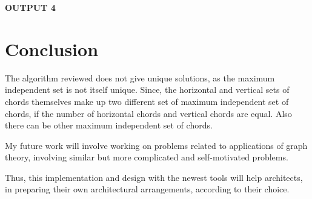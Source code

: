 \textbf{OUTPUT 4} 

\begin{figure}[h]
  \flushleft
\end{figure}

\chapter{Conclusion}
\label{Conclusion}

The algorithm reviewed does not give unique solutions, as the maximum independent set is not itself unique. Since, the horizontal and vertical sets of chords themselves make up two different set of maximum independent set of chords, if the number of horizontal chords and vertical chords are equal. Also there can be other maximum independent set of chords.

My future work will involve working on problems related to applications of graph theory, involving similar but more complicated and self-motivated problems.

Thus, this implementation and design with the newest tools will help architects, in preparing their own architectural arrangements, according to their choice.